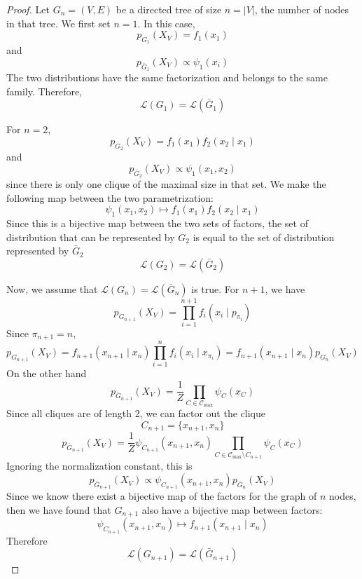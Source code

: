 \documentclass{article}
\numberwithin{equation}{section}
\theoremstyle{named}
\begin{document}
\begin{proof}
        Let $G_n = (V, E)$ be a directed tree of size $n = |V|$, the number of nodes 
        in that tree. 
        We first set $n = 1$. In this case, 
        \[
                p_{G_1}(X_V) = f_1(x_1)
        \]
        and
        \[
                p_{\bar{G}_1}(X_V) \propto \psi_1(x_i)
        \]
        The two distributions have the same factorization and belongs to the same family.
        Therefore, 
        \[
                \mathcal{L}(G_1) = \mathcal{L}(\bar{G}_1)
        \]

        For $n = 2$, 
        \[
                p_{G_2}(X_V) = f_1(x_1)f_2(x_2 \mid x_1)
        \]
        and
        \[
                p_{\bar{G}_2}(X_V) \propto \psi_1(x_1,  x_2) 
        \]
        since there is only one clique of the maximal size in that set. 
        We make the following map between the two parametrization:
        \[
                \psi_1(x_1, x_2) \mapsto f_1(x_1)f_2(x_2 \mid x_1)
        \]
        Since this is a bijective map between the two sets of factors, the 
        set of distribution that can be represented by $G_2$ is equal to the 
        set of distribution represented by $\bar{G}_2$
        \[
                \mathcal{L}(G_2) = \mathcal{L}(\bar{G}_2)
        \]

        Now, we assume that $\mathcal{L}(G_n) = \mathcal{L}(\bar{G}_n)$ is true. 
        For $n + 1$, we have
        \[
                p_{G_{n + 1}}(X_V) = \prod_{i = 1}^{n+1} f_i(x_i \mid p_{\pi_i})
        \]
        Since $\pi_{n +1} = n$, 
        \[
                p_{G_{n + 1}}(X_V) = f_{n + 1}(x_{n + 1} \mid x_{n})\prod_{i = 1}^{n} 
                f_i(x_i \mid x_{\pi_i}) = f_{n + 1}(x_{n + 1} \mid x_n) p_{G_n}(X_V)
        \]
        On the other hand
        \[
                p_{\bar{G}_{n + 1}}(X_V) = \frac{1}{Z} \prod_{C \in \mathscr{C}_{\max}} 
                \psi_C (x_C)
        \]
        Since all cliques are of length 2, we can factor out the clique 
        \[
                C_{n + 1} = \{x_{n + 1}, x_n\} 
        \]
        \[
                p_{\bar{G}_{n + 1}}(X_V) = \frac{1}{Z} \psi_{C_{n + 1}}(x_{n + 1}, x_n) 
                \prod_{C \in \mathscr{C}_{\max} \setminus C_{n + 1}} \psi_C(x_C)
        \]
        Ignoring the normalization constant, this is 
        \[
                p_{\bar{G}_{n + 1}}(X_V) 
                \propto \psi_{C_{n + 1}}(x_{n + 1}, x_n) p_{\bar{G}_n}(X_V)
        \]
        Since we know there exist a bijective map of the factors for the graph of 
        $n$ nodes, then we have found that $G_{n + 1}$ also have a bijective 
        map between factors:
        \[
                \psi_{C_{n + 1}}(x_{n + 1}, x_n) \mapsto f_{n + 1}(x_{n + 1} \mid x_n)
        \]
        Therefore
        \[
                \mathcal{L}(G_{n + 1}) = \mathcal{L}(\bar{G}_{n + 1})
        \]

\end{proof}
\end{document}
